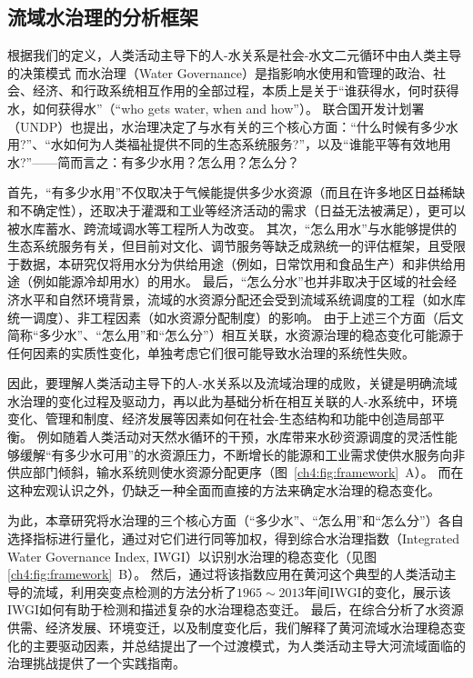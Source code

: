 
\subsection{流域水治理的分析框架}

根据我们的定义，人类活动主导下的人-水关系是社会-水文二元循环中由人类主导的决策模式
而水治理（Water Governance）是指影响水使用和管理的政治、社会、经济、和行政系统相互作用的全部过程，本质上是关于“谁获得水，何时获得水，如何获得水”（``who gets water, when and how''）。
联合国开发计划署（UNDP）也提出\cite{undpwatergovernancefacility2016}，水治理决定了与水有关的三个核心方面：“什么时候有多少水用?”、“水如何为人类福祉提供不同的生态系统服务?”，以及“谁能平等有效地用水?”——简而言之：有多少水用？怎么用？怎么分？

首先，“有多少水用”不仅取决于气候能提供多少水资源（而且在许多地区日益稀缺和不确定性），还取决于灌溉和工业等经济活动的需求（日益无法被满足），更可以被水库蓄水、跨流域调水等工程所人为改变\cite{qin2019,wada2014,huang2021}。
其次，“怎么用水”与水能够提供的生态系统服务有关，但目前对文化、调节服务等缺乏成熟统一的评估框架，且受限于数据，本研究仅将用水分为供给用途（例如，日常饮用和食品生产）和非供给用途（例如能源冷却用水）的用水\cite{liu2017,florke2018,jaeger2019}。
最后，“怎么分水”也并非取决于区域的社会经济水平和自然环境背景，流域的水资源分配还会受到流域系统调度的工程（如水库统一调度）、非工程因素（如水资源分配制度）的影响\cite{schmandt2021,speed2013}。
由于上述三个方面（后文简称“多少水”、“怎么用”和“怎么分”）相互关联，水资源治理的稳态变化可能源于任何因素的实质性变化，单独考虑它们很可能导致水治理的系统性失败。

因此，要理解人类活动主导下的人-水关系以及流域治理的成败，关键是明确流域水治理的变化过程及驱动力，再以此为基础分析在相互关联的人-水系统中，环境变化、管理和制度、经济发展等因素如何在社会-生态结构和功能中创造局部平衡\cite{falkenmark2021,bressers2013,loch2020}。
例如随着人类活动对天然水循环的干预，水库带来水砂资源调度的灵活性能够缓解“有多少水可用”的水资源压力，不断增长的能源和工业需求使供水服务向非供应部门倾斜，输水系统则使水资源分配更序（图~\ref{ch4:fig:framework}~A）。
而在这种宏观认识之外，仍缺乏一种全面而直接的方法来确定水治理的稳态变化。

为此，本章研究将水治理的三个核心方面（“多少水”、“怎么用”和“怎么分”）各自选择指标进行量化，通过对它们进行同等加权，得到综合水治理指数（Integrated Water Governance Index, IWGI）以识别水治理的稳态变化（见图\ref{ch4:fig:framework}~B）。
然后，通过将该指数应用在黄河这个典型的人类活动主导的流域，利用突变点检测的方法分析了$1965\sim2013$年间IWGI的变化，展示该IWGI如何有助于检测和描述复杂的水治理稳态变迁。
最后，在综合分析了水资源供需、经济发展、环境变迁，以及制度变化后，我们解释了黄河流域水治理稳态变化的主要驱动因素，并总结提出了一个过渡模式，为人类活动主导大河流域面临的治理挑战提供了一个实践指南。

